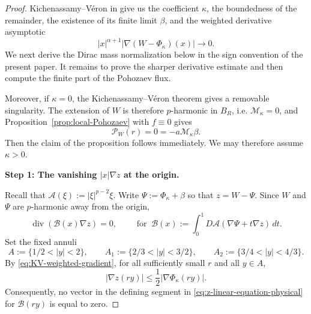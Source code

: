 \documentclass[reqno,12pt]{amsart}
\numberwithin{equation}{section}
\theoremstyle{remark}
\newcommand{\dd}{\,d}
\newcommand{\Acal}{\mathcal A}
\newcommand{\Pscr}{\mathscr P}
\begin{document}
\begin{proof}
Kichenassamy--V\'eron in \cite[Theorem~1.1 \& Remark~1.4]{KV1986} give us the coefficient $\kappa$, the boundedness of the remainder, the existence of its finite limit $\beta$, and the weighted derivative asymptotic
\begin{equation}\label{eq:KV-weighted-gradient}
|x|^{\alpha+1} |\nabla(W-\Phi_\kappa)(x)|\to 0.
\end{equation}
We next derive the  Dirac mass normalization below in the sign convention of the present paper.  It remains to prove the sharper derivative estimate and then compute the finite part of the Pohozaev flux.

Moreover, if $\kappa=0$, the Kichenassamy--V\'eron theorem gives a removable singularity.  The extension of $W$ is therefore $p$-harmonic in $B_R$, i.e. $\mathcal M_\kappa=0$, and Proposition~\ref{prop:local-Pohozaev} with $f\equiv0$ gives
$$
\Pscr_W(r)=0=-a\mathcal M_\kappa\beta.
$$
Then the claim of the proposition follows immediately. We may therefore assume $\kappa>0$. 

\medskip
\noindent
{\bf Step 1: The vanishing  $|x|\nabla z$ at the origin.}

Recall that $\Acal(\xi):=|\xi|^{p-2}\xi.$
Write
$\Psi:=\Phi_\kappa+\beta$ so that $z=W-\Psi$.  Since $W$ and $\Psi$ are $p$-harmonic away from the origin,
\begin{equation}\label{eq:z-linear-equation-physical}
\operatorname{div}(\mathcal B(x)\nabla z)=0,
\qquad \text{ for }\ 
\mathcal B(x):=\int_0^1D\Acal(\nabla\Psi+t\nabla z)\dd t.
\end{equation}
Set the fixed annuli
$$
A:=\{1/2<|y|<2\},\qquad
A_1:=\{2/3<|y|<3/2\},\qquad
A_2:=\{3/4<|y|<4/3\}.
$$
By \eqref{eq:KV-weighted-gradient}, for all sufficiently small $r$ and all $y\in A$,
$$
|\nabla z(ry)|\le\frac12|\nabla\Phi_\kappa(ry)|.
$$
Consequently, no vector in the defining segment in \eqref{eq:z-linear-equation-physical} for $\mathcal B(ry)$ is equal to zero. 


\end{proof}
\end{document}
